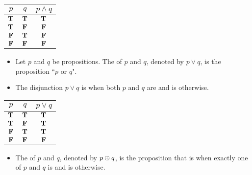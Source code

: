       \begin{center}
        \begin{tabular}{|c|c|c|}
          \hline
          $p$ & $q$ & $p \land q$ \\
          \hline
          $\mathbf{T}$ & $\mathbf{T}$ & $\mathbf{T}$ \\
          \hline
          $\mathbf{T}$ & $\mathbf{F}$ & $\mathbf{F}$ \\
          \hline
          $\mathbf{F}$ & $\mathbf{T}$ & $\mathbf{F}$ \\
          \hline
          $\mathbf{F}$ & $\mathbf{F}$ & $\mathbf{F}$ \\
          \hline
        \end{tabular}
      \end{center}

      \begin{itemize}
        \item Let $p$ and $q$ be propositions. The 
        of $p$ and $q$, denoted by $p \lor q$, is the proposition ``$p$ or $q$".
        \item The disjunction $p \lor q$ is  when both $p$ and $q$ are  and is  otherwise.
      \end{itemize}

      \begin{center}
        \begin{tabular}{|c|c|c|}
          \hline
          $p$ & $q$ & $p \lor q$ \\
          \hline
          $\mathbf{T}$ & $\mathbf{T}$ & $\mathbf{T}$ \\
          \hline
          $\mathbf{T}$ & $\mathbf{F}$ & $\mathbf{T}$ \\
          \hline
          $\mathbf{F}$ & $\mathbf{T}$ & $\mathbf{T}$ \\
          \hline
          $\mathbf{F}$ & $\mathbf{F}$ & $\mathbf{F}$ \\
          \hline
        \end{tabular}
      \end{center}

      \begin{itemize}
        \item The  of $p$ and $q$, denoted by $p \oplus q$, is the proposition that is  when
        exactly one of $p$ and $q$ is  and is  otherwise.
      \end{itemize}

